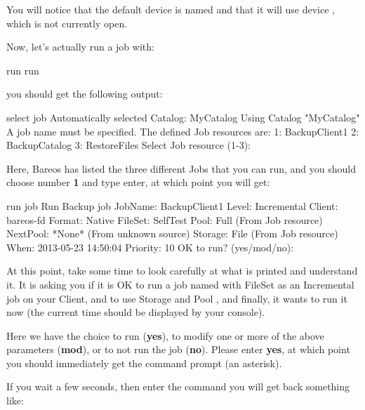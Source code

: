 You will notice that the default \bareosSd device is named  and
that it will use device , which is not currently open.

Now, let's actually run a job with:

\footnotesize
\begin{bconsole}{run}
run
\end{bconsole}
\normalsize

you should get the following output:

\footnotesize
\begin{bconsole}{select job}
Automatically selected Catalog: MyCatalog
Using Catalog "MyCatalog"
A job name must be specified.
The defined Job resources are:
     1: BackupClient1
     2: BackupCatalog
     3: RestoreFiles
Select Job resource (1-3):
\end{bconsole}
\normalsize

Here, Bareos has listed the three different Jobs that you can run, and you
should choose number {\bf 1} and type enter, at which point you will get:

\footnotesize
\begin{bconsole}{run job}
Run Backup job
JobName:  BackupClient1
Level:    Incremental
Client:   bareos-fd
Format:   Native
FileSet:  SelfTest
Pool:     Full (From Job resource)
NextPool: *None* (From unknown source)
Storage:  File (From Job resource)
When:     2013-05-23 14:50:04
Priority: 10
OK to run? (yes/mod/no):
\end{bconsole}
\normalsize

At this point, take some time to look carefully at what is printed and
understand it. It is asking you if it is OK to run a job named 
with FileSet  as an Incremental job on your
Client, and to use Storage  and
Pool , and finally, it wants to run it now (the current time
should be displayed by your console).

Here we have the choice to run ({\bf yes}), to modify one or more of the above
parameters ({\bf mod}), or to not run the job ({\bf no}). Please enter {\bf
yes}, at which point you should immediately get the command prompt (an
asterisk).

If you wait a few seconds, then enter the command 
you will get back something like:


